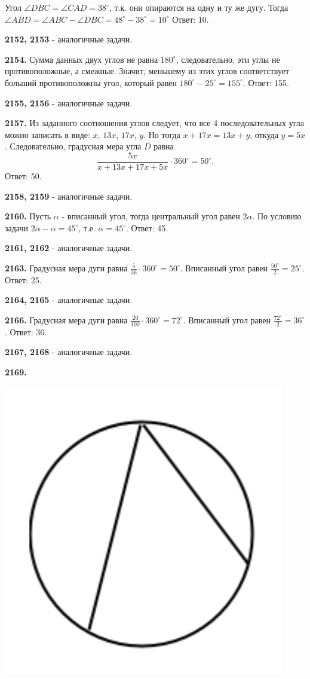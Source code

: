 Угол $\angle DBC = \angle CAD = 38^\circ$, т.к. они опираются на одну и ту же дугу. Тогда $\angle ABD = \angle ABC - \angle DBC = 48^\circ - 38^\circ=10^\circ$ \newline \null \hspace*{\fill} Ответ: 10.

\textbf{2152, 2153} - аналогичные задачи.

\textbf{2154.} Сумма данных двух углов не равна $180^\circ$, следовательно, эти углы не противоположные, а смежные. Значит, меньшему из этих углов соответствует больший противоположны угол, который равен $180^\circ-25^\circ=155^\circ$.\newline \null \hspace*{\fill} Ответ: 155.

\textbf{2155, 2156} - аналогичные задачи.

\textbf{2157.} Из заданного соотношения углов следует, что все 4 последовательных угла  можно записать в виде: $x$, $13x$, $17x$, $y$. Но тогда $x+17x=13x+y$, откуда $y=5x$. Следовательно, градусная мера угла $D$ равна
\[
\frac{5x}{x+13x+17x+5x}\cdot360^\circ=50^\circ.
\]\null \hspace*{\fill} Ответ: 50.

\textbf{2158, 2159} - аналогичные задачи.

\textbf{2160.} Пусть $\alpha$ - вписанный угол, тогда центральный угол равен $2\alpha$. По условию задачи $2\alpha - \alpha = 45^\circ$, т.е. $\alpha = 45^\circ$. \newline \null \hspace*{\fill} Ответ: 45.

\textbf{2161, 2162} - аналогичные задачи.

\textbf{2163.} Градусная мера дуги равна $\frac{5}{36}\cdot360^\circ=50^\circ$. Вписанный угол равен $\frac{50^\circ}{2} = 25^\circ$. \newline \null \hspace*{\fill} Ответ: 25.

\textbf{2164, 2165} - аналогичные задачи.

\textbf{2166.} Градусная мера дуги равна $\frac{20}{100}\cdot360^\circ=72^\circ$. Вписанный угол равен $\frac{72^\circ}{2} = 36^\circ$. \newline \null \hspace*{\fill} Ответ: 36.

\textbf{2167, 2168} - аналогичные задачи.

\textbf{2169.}

{\centering \includegraphics[width=0.35\linewidth]{Geometry/Content/45.png}
	
}

